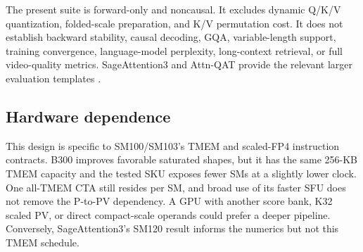 The present suite is forward-only and noncausal. It excludes dynamic Q/K/V
quantization, folded-scale preparation, and K/V permutation cost. It does not
establish backward stability, causal decoding, GQA, variable-length support,
training convergence, language-model perplexity, long-context retrieval, or
full video-quality metrics. SageAttention3 and Attn-QAT provide the relevant
larger evaluation templates \cite{zhang2025sageattention3,zhang2026attnqat}.

\subsection{Hardware dependence}

This design is specific to SM100/SM103's TMEM and scaled-FP4 instruction
contracts. B300 improves favorable saturated shapes, but it has the same
256-KB TMEM capacity and the tested SKU exposes fewer SMs at a slightly lower
clock. One all-TMEM CTA still resides per SM, and broad use of its faster SFU
does not remove the P-to-PV dependency. A GPU with another score bank, K32
scaled PV, or direct compact-scale operands could prefer a deeper pipeline.
Conversely, SageAttention3's SM120 result informs the numerics but not this
TMEM schedule.
